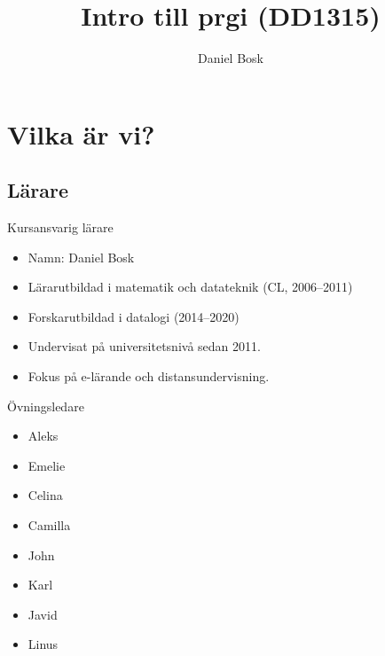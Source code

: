 \title{%
  Intro till prgi (DD1315)
}
\author{Daniel Bosk}


\mode*

\begin{abstract}
  
\end{abstract}


\section{Vilka är vi?}

\subsection{Lärare}

\begin{frame}
  \begin{block}{Kursansvarig lärare}
    \begin{itemize}
      \item Namn: Daniel Bosk
      \item Lärarutbildad i matematik och datateknik (CL, 2006--2011)
      \item Forskarutbildad i datalogi (2014--2020)
      \item Undervisat på universitetsnivå sedan 2011.
      \item Fokus på e-lärande och distansundervisning.
    \end{itemize}
  \end{block}
\end{frame}

\begin{frame}
  \begin{block}{Övningsledare}
    \begin{itemize}
      \item Aleks
      \item Emelie
      \item Celina
      \item Camilla
      \item John
      \item Karl
      \item Javid
      \item Linus
    \end{itemize}
  \end{block}
\end{frame}

